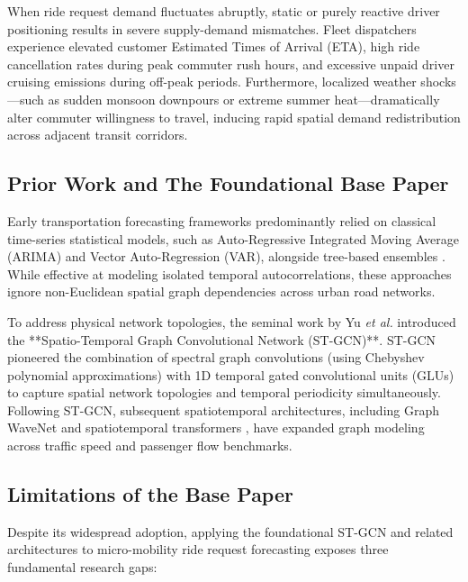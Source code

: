 \documentclass[10pt,journal,compsoc]{IEEEtran}
\begin{document}
When ride request demand fluctuates abruptly, static or purely reactive driver positioning results in severe supply-demand mismatches. Fleet dispatchers experience elevated customer Estimated Times of Arrival (ETA), high ride cancellation rates during peak commuter rush hours, and excessive unpaid driver cruising emissions during off-peak periods. Furthermore, localized weather shocks—such as sudden monsoon downpours or extreme summer heat—dramatically alter commuter willingness to travel, inducing rapid spatial demand redistribution across adjacent transit corridors.

\subsection{Prior Work and The Foundational Base Paper}
Early transportation forecasting frameworks predominantly relied on classical time-series statistical models, such as Auto-Regressive Integrated Moving Average (ARIMA) and Vector Auto-Regression (VAR), alongside tree-based ensembles \cite{li2022short}. While effective at modeling isolated temporal autocorrelations, these approaches ignore non-Euclidean spatial graph dependencies across urban road networks.

To address physical network topologies, the seminal work by Yu \emph{et al.} \cite{yu2018spatio} introduced the **Spatio-Temporal Graph Convolutional Network (ST-GCN)**. ST-GCN pioneered the combination of spectral graph convolutions (using Chebyshev polynomial approximations) with 1D temporal gated convolutional units (GLUs) to capture spatial network topologies and temporal periodicity simultaneously. Following ST-GCN, subsequent spatiotemporal architectures, including Graph WaveNet \cite{wu2019graph} and spatiotemporal transformers \cite{wang2025adformer, sharma2026attention}, have expanded graph modeling across traffic speed and passenger flow benchmarks.

\subsection{Limitations of the Base Paper}
Despite its widespread adoption, applying the foundational ST-GCN \cite{yu2018spatio} and related architectures to micro-mobility ride request forecasting exposes three fundamental research gaps:
\end{document}
